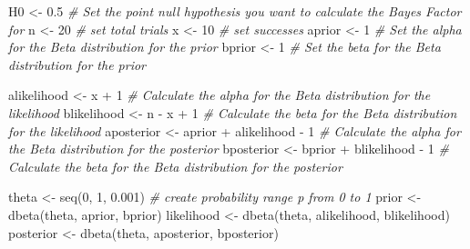 \documentclass[
  oneside]{krantz}
\makeatletter
\newenvironment{Shaded}{\begin{snugshade}}{\end{snugshade}}
\newcommand{\CommentTok}[1]{\textcolor[rgb]{0.37,0.37,0.37}{\textit{#1}}}
\newcommand{\DecValTok}[1]{\textcolor[rgb]{0.06,0.06,0.06}{#1}}
\newcommand{\FloatTok}[1]{\textcolor[rgb]{0.06,0.06,0.06}{#1}}
\newcommand{\FunctionTok}[1]{\textcolor[rgb]{0,0,0}{#1}}
\newcommand{\NormalTok}[1]{#1}
\newcommand{\OtherTok}[1]{\textcolor[rgb]{0.37,0.37,0.37}{#1}}
\newcommand{\SpecialCharTok}[1]{\textcolor[rgb]{0,0,0}{#1}}
\newenvironment{kframe}{%
\medskip{}
\setlength{\fboxsep}{.8em}
 \def\at@end@of@kframe{}%
 \ifinner\ifhmode%
  \def\at@end@of@kframe{\end{minipage}}%
  \begin{minipage}{\columnwidth}%
 \fi\fi%
 \def\FrameCommand##1{\hskip\@totalleftmargin \hskip-\fboxsep
 \colorbox{shadecolor}{##1}\hskip-\fboxsep
     \hskip-\linewidth \hskip-\@totalleftmargin \hskip\columnwidth}%
 \MakeFramed {\advance\hsize-\width
   \@totalleftmargin\z@ \linewidth\hsize
   \@setminipage}}%
 {\par\unskip\endMakeFramed%
 \at@end@of@kframe}
\renewenvironment{Shaded}{\begin{kframe}}{\end{kframe}}
\makeatother
\begin{document}
\begin{Shaded}
\begin{Highlighting}[]
\NormalTok{H0 }\OtherTok{\textless{}{-}} \FloatTok{0.5} \CommentTok{\# Set the point null hypothesis you want to calculate the Bayes Factor for}
\NormalTok{n }\OtherTok{\textless{}{-}} \DecValTok{20} \CommentTok{\# set total trials}
\NormalTok{x }\OtherTok{\textless{}{-}} \DecValTok{10} \CommentTok{\# set successes}
\NormalTok{aprior }\OtherTok{\textless{}{-}} \DecValTok{1} \CommentTok{\# Set the alpha for the Beta distribution for the prior}
\NormalTok{bprior }\OtherTok{\textless{}{-}} \DecValTok{1} \CommentTok{\# Set the beta for the Beta distribution for the prior}

\NormalTok{alikelihood }\OtherTok{\textless{}{-}}\NormalTok{ x }\SpecialCharTok{+} \DecValTok{1} \CommentTok{\# Calculate the alpha for the Beta distribution for the likelihood}
\NormalTok{blikelihood }\OtherTok{\textless{}{-}}\NormalTok{ n }\SpecialCharTok{{-}}\NormalTok{ x }\SpecialCharTok{+} \DecValTok{1} \CommentTok{\# Calculate the beta for the Beta distribution for the likelihood}
\NormalTok{aposterior }\OtherTok{\textless{}{-}}\NormalTok{ aprior }\SpecialCharTok{+}\NormalTok{ alikelihood }\SpecialCharTok{{-}} \DecValTok{1} \CommentTok{\# Calculate the alpha for the Beta distribution for the posterior}
\NormalTok{bposterior }\OtherTok{\textless{}{-}}\NormalTok{ bprior }\SpecialCharTok{+}\NormalTok{ blikelihood }\SpecialCharTok{{-}} \DecValTok{1} \CommentTok{\# Calculate the beta for the Beta distribution for the posterior}

\NormalTok{theta }\OtherTok{\textless{}{-}} \FunctionTok{seq}\NormalTok{(}\DecValTok{0}\NormalTok{, }\DecValTok{1}\NormalTok{, }\FloatTok{0.001}\NormalTok{) }\CommentTok{\# create probability range p from 0 to 1}
\NormalTok{prior }\OtherTok{\textless{}{-}} \FunctionTok{dbeta}\NormalTok{(theta, aprior, bprior)}
\NormalTok{likelihood }\OtherTok{\textless{}{-}} \FunctionTok{dbeta}\NormalTok{(theta, alikelihood, blikelihood)}
\NormalTok{posterior }\OtherTok{\textless{}{-}} \FunctionTok{dbeta}\NormalTok{(theta, aposterior, bposterior)}


\end{Highlighting}
\end{Shaded}
\end{document}
